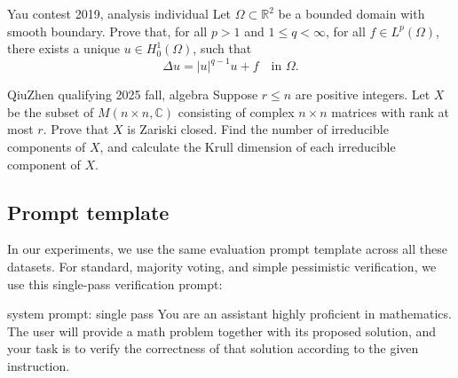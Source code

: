 \documentclass{article} %
\begin{document}
\begin{promptbox}{Yau contest 2019, analysis individual}
Let $\Omega\subset\mathbb{R}^2$ be a bounded domain with smooth boundary. Prove that, for all $p>1$ and $1\le q<\infty$, for all $f\in L^p(\Omega)$, there exists a unique $u\in H_0^1(\Omega)$, such that $$\Delta u = |u|^{q-1}u + f \quad \text{in } \Omega.$$
\end{promptbox}

\begin{promptbox}{QiuZhen qualifying 2025 fall, algebra}
Suppose $r \le n$ are positive integers. Let $X$ be the subset of $M(n \times n, \mathbb{C})$ consisting of complex $n \times n$ matrices with rank at most $r$. Prove that $X$ is Zariski closed. Find the number of irreducible components of $X$, and calculate the Krull dimension of each irreducible component of $X$.
\end{promptbox}

\subsection{Prompt template}

In our experiments, we use the same evaluation prompt template across all these datasets. For standard, majority voting, and simple pessimistic verification, we use this single-pass verification prompt:

\begin{promptlisting}{system prompt: single pass}
You are an assistant highly proficient in mathematics.
The user will provide a math problem together with its proposed solution, and your task is to verify the correctness of that solution according to the given instruction.
\end{promptlisting}
\end{document}
